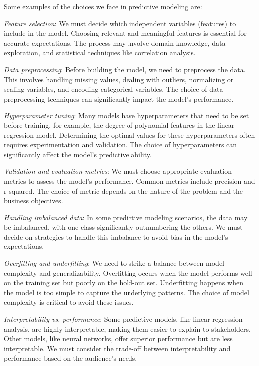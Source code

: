 Some examples of the choices we face in predictive modeling are:

\begin{compactitem}
\item \textit{Feature selection}: We must decide which independent variables (features) to include in the model. Choosing relevant and meaningful features is essential for accurate expectations. The process may involve domain knowledge, data exploration, and statistical techniques like correlation analysis.
\item \textit{Data preprocessing}: Before building the model, we need to preprocess the data. This involves handling missing values, dealing with outliers, normalizing or scaling variables, and encoding categorical variables. The choice of data preprocessing techniques can significantly impact the model's performance.
\item \textit{Hyperparameter tuning}: Many models have hyperparameters that need to be set before training, for example, the degree of polynomial features in the linear regression model. Determining the optimal values for these hyperparameters often requires experimentation and validation. The choice of hyperparameters can significantly affect the model's predictive ability.
\item \textit{Validation and evaluation metrics}: We must choose appropriate evaluation metrics to assess the model's performance. Common metrics include precision and r-squared. The choice of metric depends on the nature of the problem and the business objectives.
\item \textit{Handling imbalanced data}: In some predictive modeling scenarios, the data may be imbalanced, with one class significantly outnumbering the others. We must decide on strategies to handle this imbalance to avoid bias in the model's expectations.
\item \textit{Overfitting and underfitting}: We need to strike a balance between model complexity and generalizability. Overfitting occurs when the model performs well on the training set but poorly on the hold-out set. Underfitting happens when the model is too simple to capture the underlying patterns. The choice of model complexity is critical to avoid these issues.
\item \textit{Interpretability vs. performance}: Some predictive models, like linear regression analysis, are highly interpretable, making them easier to explain to stakeholders. Other models, like neural networks, offer superior performance but are less interpretable. We must consider the trade-off between interpretability and performance based on the audience's needs.
\end{compactitem}

